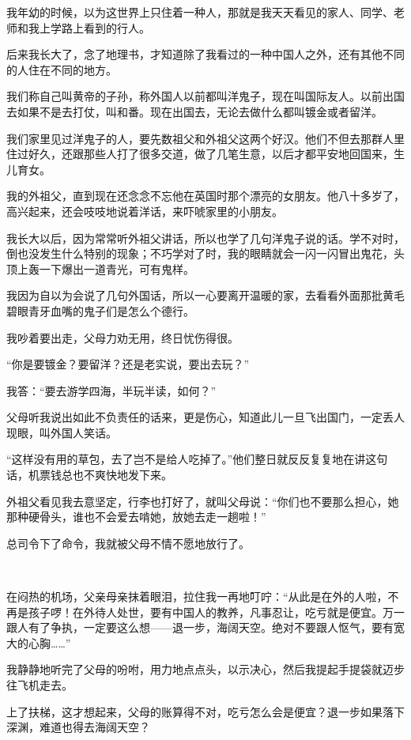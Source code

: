 \par 我年幼的时候，以为这世界上只住着一种人，那就是我天天看见的家人、同学、老师和我上学路上看到的行人。
\par 后来我长大了，念了地理书，才知道除了我看过的一种中国人之外，还有其他不同的人住在不同的地方。
\par 我们称自己叫黄帝的子孙，称外国人以前都叫洋鬼子，现在叫国际友人。以前出国去如果不是去打仗，叫和番。现在出国去，无论去做什么都叫镀金或者留洋。
\par 我们家里见过洋鬼子的人，要先数祖父和外祖父这两个好汉。他们不但去那群人里住过好久，还跟那些人打了很多交道，做了几笔生意，以后才都平安地回国来，生儿育女。
\par 我的外祖父，直到现在还念念不忘他在英国时那个漂亮的女朋友。他八十多岁了，高兴起来，还会吱吱地说着洋话，来吓唬家里的小朋友。
\par 我长大以后，因为常常听外祖父讲话，所以也学了几句洋鬼子说的话。学不对时，倒也没发生什么特别的现象；不巧学对了时，我的眼睛就会一闪一闪冒出鬼花，头顶上轰一下爆出一道青光，可有鬼样。
\par 我因为自以为会说了几句外国话，所以一心要离开温暖的家，去看看外面那批黄毛碧眼青牙血嘴的鬼子们是怎么个德行。
\par 我吵着要出走，父母力劝无用，终日忧伤得很。
\par “你是要镀金？要留洋？还是老实说，要出去玩？”
\par 我答：“要去游学四海，半玩半读，如何？”
\par 父母听我说出如此不负责任的话来，更是伤心，知道此儿一旦飞出国门，一定丢人现眼，叫外国人笑话。
\par “这样没有用的草包，去了岂不是给人吃掉了。”他们整日就反反复复地在讲这句话，机票钱总也不爽快地发下来。
\par 外祖父看见我去意坚定，行李也打好了，就叫父母说：“你们也不要那么担心，她那种硬骨头，谁也不会爱去啃她，放她去走一趟啦！”
\par 总司令下了命令，我就被父母不情不愿地放行了。
\par  
\par 在闷热的机场，父亲母亲抹着眼泪，拉住我一再地叮咛：“从此是在外的人啦，不再是孩子啰！在外待人处世，要有中国人的教养，凡事忍让，吃亏就是便宜。万一跟人有了争执，一定要这么想——退一步，海阔天空。绝对不要跟人怄气，要有宽大的心胸……”
\par 我静静地听完了父母的吩咐，用力地点点头，以示决心，然后我提起手提袋就迈步往飞机走去。
\par 上了扶梯，这才想起来，父母的账算得不对，吃亏怎么会是便宜？退一步如果落下深渊，难道也得去海阔天空？
